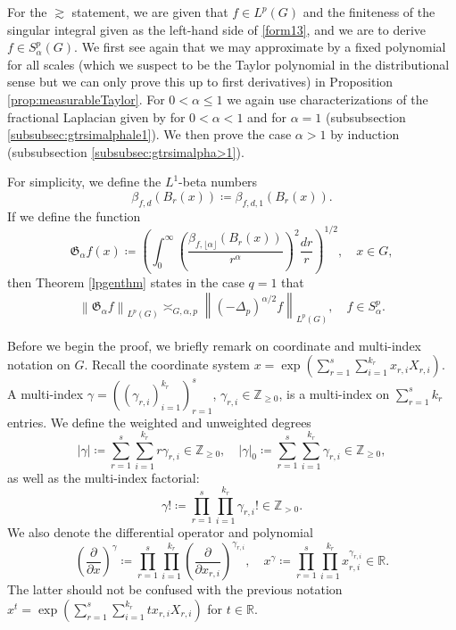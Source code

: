 \documentclass[11pt,reqno]{amsart}
\newcommand{\1}{\mathbf 1}
\begin{document}
For the $\gtrsim$ statement, we are given that $f\in L^p\left(G\right)$ and the finiteness of the singular integral given as the left-hand side of \eqref{form13}, and we are to derive $f\in S^p_\alpha\left(G\right)$. We first see again that we may approximate by a fixed polynomial for all scales (which we suspect to be the Taylor polynomial in the distributional sense but we can only prove this up to first derivatives) in Proposition \ref{prop:measurableTaylor}. For $0<\alpha\le 1$ we again use characterizations of the fractional Laplacian given by \cite[Theorem 5]{coulhon2001sobolev} for $0<\alpha<1$ and \cite[Theorem 1.4]{de2021mean} for $\alpha=1$ (subsubsection \ref{subsubsec:gtrsimalphale1}). We then prove the case $\alpha>1$ by induction (subsubsection \ref{subsubsec:gtrsimalpha>1}).

For simplicity, we define the $L^1$-beta numbers
\[
\beta_{f,d}\left(B_r\left(x\right)\right)\coloneqq \beta_{f,d,1}\left(B_r\left(x\right)\right).
\]
If we define the function
\[
\mathfrak{G}_\alpha f\left(x\right)\coloneqq \left(\int_0^\infty \left(\frac{\beta_{f,\lfloor\alpha\rfloor}\left(B_r\left(x\right)\right)}{r^\alpha}\right)^2 \frac{dr}r\right)^{1/2}, \quad x\in G,
\]
then Theorem \ref{lpgenthm} states in the case $q=1$ that
\begin{equation}\label{eq:alphaIneq}
\left\|\mathfrak{G}_\alpha f\right\|_{L^p\left(G\right)}\asymp_{G,\alpha,p} \left\|\left(-\Delta_p\right)^{\alpha/2}f\right\|_{L^p\left(G\right)},\quad f\in S^p_\alpha.
\end{equation}

Before we begin the proof, we briefly remark on coordinate and multi-index notation on $G$. Recall the coordinate system $x=\exp\left(\sum_{r=1}^s\sum_{i=1}^{k_r}x_{r,i}X_{r,i}\right)$. A multi-index $\gamma= \left(\left(\gamma_{r,i}\right)_{i=1}^{k_r}\right)_{r=1}^s$, $\gamma_{r,i}\in \mathbb{Z}_{\ge 0}$, is a multi-index on $\sum_{r=1}^s k_r$ entries. We define the weighted and unweighted degrees
\[
\left|\gamma\right|\coloneqq \sum_{r=1}^s\sum_{i=1}^{k_r}r\gamma_{r,i}\in \mathbb{Z}_{\ge 0},\quad \left|\gamma\right|_0\coloneqq \sum_{r=1}^s\sum_{i=1}^{k_r}\gamma_{r,i}\in \mathbb{Z}_{\ge 0},
\]
as well as the multi-index factorial:
\[
\gamma!\coloneqq\prod_{r=1}^s\prod_{i=1}^{k_r} \gamma_{r,i}!\in \mathbb{Z}_{>0}.
\]
We also denote the differential operator and polynomial
\[
\left(\frac{\partial}{\partial x}\right)^\gamma\coloneqq\prod_{r=1}^s\prod_{i=1}^{k_r} \left(\frac{\partial}{\partial x_{r,i}}\right)^{\gamma_{r,i}},\quad x^\gamma \coloneqq\prod_{r=1}^s\prod_{i=1}^{k_r}x_{r,i}^{\gamma_{r,i}}\in \mathbb{R}.
\]
The latter should not be confused with the previous notation $x^t=\exp\left(\sum_{r=1}^s\sum_{i=1}^{k_r}tx_{r,i}X_{r,i}\right)$ for $t\in \mathbb{R}$.
\end{document}
